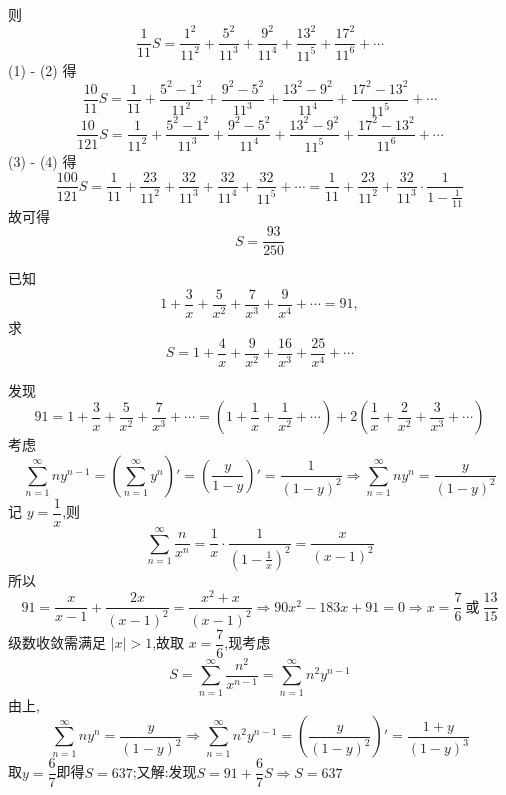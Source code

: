 \begin{questions}
\begin{solution}
\[        \]
        则
        \[
        \frac{1}{11}S=\frac{1^{2}}{11^2} + \frac{5^{2}}{11^{3}} + \frac{9^{2}}{11^{4}} + \frac{13^{2}}{11^{5}} + \frac{17^{2}}{11^{6}} + \cdots \tag{2}
        \]
        (1) - (2) 得
        \[
        \frac{10}{11} S = \frac{1}{11} + \frac{5^2-1^2}{11^2} + \frac{9^2-5^2}{11^3} + \frac{13^2-9^2}{11^4} + \frac{17^2-13^2}{11^5} + \cdots \tag{3}
        \]
        \[
        \frac{10}{121} S = \frac{1}{11^2} + \frac{5^2-1^2}{11^3} + \frac{9^2-5^2}{11^4} + \frac{13^2-9^2}{11^5} + \frac{17^2-13^2}{11^6} + \cdots \tag{4}
        \]
        (3) - (4) 得
        \[
        \frac{100}{121} S = \frac{1}{11} + \frac{23}{11^2} + \frac{32}{11^3} + \frac{32}{11^4} + \frac{32}{11^5} + \cdots = \frac{1}{11} + \frac{23}{11^2} + \frac{32}{11^3} \cdot \frac{1}{1 - \frac{1}{11}}
        \]
        故可得
        \[
        S = \frac{93}{250}
        \]
    \end{solution}

    \question 已知
    \[
    1 + \frac{3}{x} + \frac{5}{x^2} + \frac{7}{x^3} + \frac{9}{x^4} + \cdots = 91,
    \]
    求
    \[
    S=1 + \frac{4}{x} + \frac{9}{x^2} + \frac{16}{x^3} + \frac{25}{x^4} + \cdots
    \]
    \begin{solution}
        发现
        \[
        91 = 1 + \frac{3}{x} + \frac{5}{x^2} + \frac{7}{x^3} + \cdots = \left(1 + \frac{1}{x} + \frac{1}{x^2} + \cdots \right) + 2\left( \frac{1}{x} + \frac{2}{x^2} + \frac{3}{x^3} + \cdots \right)
        \]
        考虑
        \[
        \sum_{n=1}^{\infty} n y^{n-1} =\left(\sum_{n=1}^{\infty} y^n\right)'=\left(\frac{y}{1-y}\right)'= \frac{1}{(1 - y)^2}
        \Rightarrow \sum_{n=1}^{\infty} n y^n = \frac{y}{(1 - y)^2}\]
        记 \(y = \dfrac{1}{x}\),则
        \[
        \sum_{n=1}^{\infty} \frac{n}{x^n} = \frac{1}{x} \cdot \frac{1}{(1 - \frac{1}{x})^2} = \frac{x}{(x - 1)^2}
        \]
        所以
        \[
        91= \frac{x}{x - 1} + \frac{2x}{(x - 1)^2} = \frac{x^2 + x}{(x - 1)^2} \Rightarrow 90x^2 - 183x + 91 = 0 \Rightarrow x = \frac{7}{6} \ \text{或} \ \frac{13}{15}
        \]
        级数收敛需满足 \(|x| > 1\),故取 \(x = \dfrac{7}{6}\),现考虑
        \[
        S=\sum_{n=1}^\infty \frac{n^2}{x^{n-1}}=\sum_{n=1}^{\infty} n^2 y^{n-1}
        \]
        由上,
        \[
        \sum_{n=1}^{\infty} n y^n = \frac{y}{(1 - y)^2}
        \Rightarrow \sum_{n=1}^{\infty} n^2 y^{n-1} = \left( \frac{y}{(1 - y)^2} \right)' = \frac{1 + y}{(1 - y)^3}
        \]
        取$y=\dfrac67$即得$S=637$;又解:发现$S=91+\dfrac{6}{7}S \Rightarrow S=637$
    \end{solution}


\end{questions}
